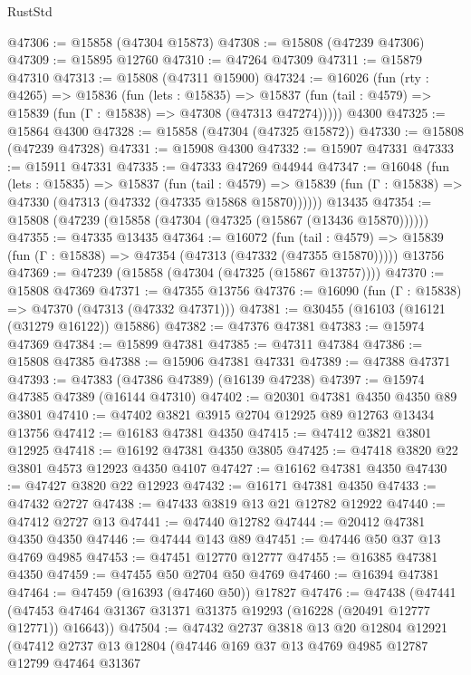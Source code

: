 \begin{lexlean}{RustStd}
\begin{coremodule}
@47306 := @15858 (@47304 @15873)
@47308 := @15808 (@47239 @47306)
@47309 := @15895 @12760
@47310 := @47264 @47309
@47311 := @15879 @47310
@47313 := @15808 (@47311 @15900)
@47324 := @16026
    (fun (rty : @4265) =>
    @15836
      (fun (lets : @15835) =>
      @15837 (fun (tail : @4579) => @15839 (fun (Γ : @15838) => @47308 (@47313 @47274)))))
    @4300
@47325 := @15864 @4300
@47328 := @15858 (@47304 (@47325 @15872))
@47330 := @15808 (@47239 @47328)
@47331 := @15908 @4300
@47332 := @15907 @47331
@47333 := @15911 @47331
@47335 := @47333 @47269 @44944
@47347 := @16048
    (fun (lets : @15835) =>
    @15837
      (fun (tail : @4579) =>
      @15839 (fun (Γ : @15838) => @47330 (@47313 (@47332 (@47335 @15868 @15870))))))
    @13435
@47354 := @15808 (@47239 (@15858 (@47304 (@47325 (@15867 (@13436 @15870))))))
@47355 := @47335 @13435
@47364 := @16072
    (fun (tail : @4579) => @15839 (fun (Γ : @15838) => @47354 (@47313 (@47332 (@47355 @15870)))))
    @13756
@47369 := @47239 (@15858 (@47304 (@47325 (@15867 @13757))))
@47370 := @15808 @47369
@47371 := @47355 @13756
@47376 := @16090 (fun (Γ : @15838) => @47370 (@47313 (@47332 @47371)))
@47381 := @30455 (@16103 (@16121 (@31279 @16122)) @15886)
@47382 := @47376 @47381
@47383 := @15974 @47369
@47384 := @15899 @47381
@47385 := @47311 @47384
@47386 := @15808 @47385
@47388 := @15906 @47381 @47331
@47389 := @47388 @47371
@47393 := @47383 (@47386 @47389) (@16139 @47238)
@47397 := @15974 @47385 @47389 (@16144 @47310)
@47402 := @20301 @47381 @4350 @4350 @89 @3801
@47410 := @47402 @3821 @3915 @2704 @12925 @89 @12763 @13434 @13756
@47412 := @16183 @47381 @4350
@47415 := @47412 @3821 @3801 @12925
@47418 := @16192 @47381 @4350 @3805
@47425 := @47418 @3820 @22 @3801 @4573 @12923 @4350 @4107
@47427 := @16162 @47381 @4350
@47430 := @47427 @3820 @22 @12923
@47432 := @16171 @47381 @4350
@47433 := @47432 @2727
@47438 := @47433 @3819 @13 @21 @12782 @12922
@47440 := @47412 @2727 @13
@47441 := @47440 @12782
@47444 := @20412 @47381 @4350 @4350
@47446 := @47444 @143 @89
@47451 := @47446 @50 @37 @13 @4769 @4985
@47453 := @47451 @12770 @12777
@47455 := @16385 @47381 @4350
@47459 := @47455 @50 @2704 @50 @4769
@47460 := @16394 @47381
@47464 := @47459 (@16393 (@47460 @50)) @17827
@47476 := @47438
    (@47441 (@47453 @47464 @31367 @31371 @31375 @19293 (@16228 (@20491 @12777 @12771)) @16643))
@47504 := @47432
    @2737
    @3818
    @13
    @20
    @12804
    @12921
    (@47412
      @2737
      @13
      @12804
      (@47446
        @169
        @37
        @13
        @4769
        @4985
        @12787
        @12799
        @47464
        @31367

\end{coremodule}
\end{lexlean}

